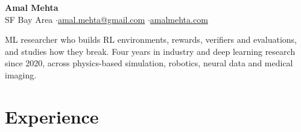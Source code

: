 \documentclass[10pt]{article}
\begin{document}
\fontsize{9.8}{10.5}\selectfont

\begin{center}
{\LARGE\bfseries Amal Mehta}\\[3pt]
SF Bay Area \quad$\cdot$\quad \href{mailto:amal.mehta@gmail.com}{amal.mehta@gmail.com} \quad$\cdot$\quad \href{https://amalmehta.com/}{amalmehta.com}
\end{center}

ML researcher who builds RL environments, rewards, verifiers and evaluations, and studies how they break. Four years in industry and deep learning research since 2020, across physics-based simulation, robotics, neural data and medical imaging.

\section*{Experience}
\end{document}
